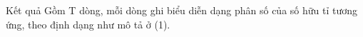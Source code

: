 Kết quả  
Gồm T dòng, mỗi dòng ghi biểu diễn dạng phân số của số hữu tỉ tương ứng, theo định dạng như mô tả ở (1).